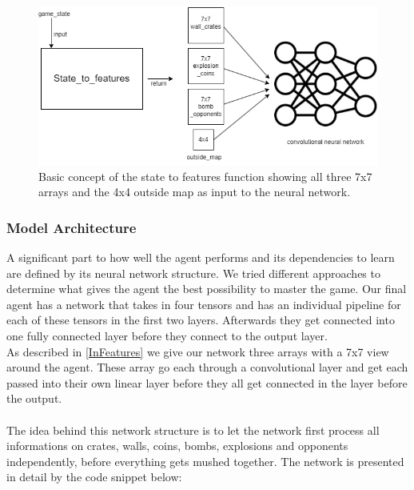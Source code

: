 \begin{figure}[H]
    \centering
    
    \includegraphics[width=\oneImgWidth]{images/chartFinalProjStates}%
    
    \captionadjust%
    \caption{\label{fig:chartFinalProjStates} Basic concept of the state to features function showing all three 7x7 arrays and the 4x4 outside map as input to the neural network.
    }%
\end{figure}

\subsubsection{Model Architecture} \label{NetworkS}

A significant part to how well the agent performs and its dependencies to learn are defined by its neural network structure.
We tried different approaches to determine what gives the agent the best possibility to master the game.
Our final agent has a network that takes in four tensors and has an individual pipeline for each of these tensors in the first two layers. Afterwards they get connected into one fully connected layer before they connect to the output layer.\\
As described in \ref{InFeatures} we give our network three arrays with a 7x7 view around the agent. These array go each through a convolutional layer and get each passed into their own linear layer before they all get connected in the layer before the output.\\ \\
The idea behind this network structure is to let the network first process all informations on crates, walls, coins, bombs, explosions and opponents independently, before everything gets mushed together.
The network is presented in detail by the code snippet below: 

